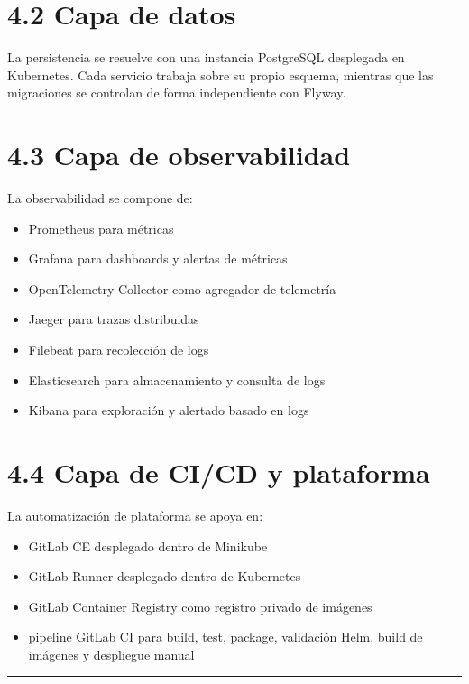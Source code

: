 \documentclass[
a4paper,
12pt]{report}
\providecommand{\tightlist}{%
  \setlength{\itemsep}{0pt}\setlength{\parskip}{0pt}}
\begin{document}
\section{4.2 Capa de datos}\label{capa-de-datos}

La persistencia se resuelve con una instancia PostgreSQL desplegada en
Kubernetes. Cada servicio trabaja sobre su propio esquema, mientras que
las migraciones se controlan de forma independiente con Flyway.

\section{4.3 Capa de observabilidad}\label{capa-de-observabilidad}

La observabilidad se compone de:

\begin{itemize}
\tightlist
\item
  Prometheus para métricas
\item
  Grafana para dashboards y alertas de métricas
\item
  OpenTelemetry Collector como agregador de telemetría
\item
  Jaeger para trazas distribuidas
\item
  Filebeat para recolección de logs
\item
  Elasticsearch para almacenamiento y consulta de logs
\item
  Kibana para exploración y alertado basado en logs
\end{itemize}

\section{4.4 Capa de CI/CD y
plataforma}\label{capa-de-cicd-y-plataforma}

La automatización de plataforma se apoya en:

\begin{itemize}
\tightlist
\item
  GitLab CE desplegado dentro de Minikube
\item
  GitLab Runner desplegado dentro de Kubernetes
\item
  GitLab Container Registry como registro privado de imágenes
\item
  pipeline GitLab CI para build, test, package, validación Helm, build
  de imágenes y despliegue manual
\end{itemize}

\begin{center}\rule{0.5\linewidth}{0.5pt}\end{center}
\end{document}
